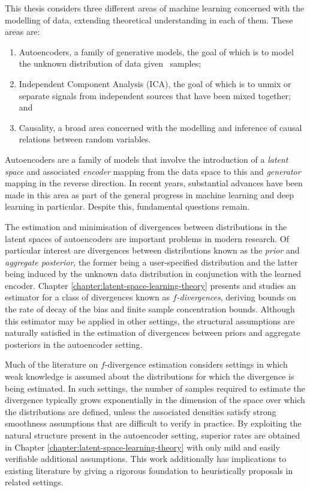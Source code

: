 This thesis considers three different areas of machine learning concerned with the modelling of data, extending theoretical understanding in each of them.
These areas are:
\begin{enumerate}
\item Autoencoders, a family of generative models, the goal of which is to model the unknown distribution of data given \iid~samples;
\item Independent Component Analysis (ICA), the goal of which is to unmix or separate signals from independent sources that have been mixed together; and
\item Causality, a broad area concerned with the modelling and inference of causal relations between random variables.
\end{enumerate}
Autoencoders are a family of models that involve the introduction of a \emph{latent space} and associated \emph{encoder} mapping from the data space to this and \emph{generator} mapping in the reverse direction. 
In recent years, substantial advances have been made in this area as part of the general progress in machine learning and deep learning in particular.
Despite this, fundamental questions remain.

The estimation and minimisation of divergences between distributions in the latent spaces of autoencoders are important problems in modern research.
Of particular interest are divergences between distributions known as the \emph{prior} and \emph{aggregate posterior}, the former being a user-specified distribution and the latter being induced by the unknown data distribution in conjunction with the learned encoder.
Chapter \ref{chapter:latent-space-learning-theory} presents and studies an estimator for a class of divergences known as \emph{$f$-divergences}, deriving bounds on the rate of decay of the bias and finite sample concentration bounds.
Although this estimator may be applied in other settings, the structural assumptions are naturally satisfied in the estimation of divergences between priors and aggregate posteriors in the autoencoder setting. 


Much of the literature on $f$-divergence estimation considers settings in which weak knowledge is assumed about the distributions for which the divergence is being estimated. 
In such settings, the number of samples required to estimate the divergence typically grows exponentially in the dimension of the space over which the distributions are defined, unless the associated densities satisfy strong smoothness assumptions that are difficult to verify in practice.
By exploiting the natural structure present in the autoencoder setting, superior rates are obtained in Chapter \ref{chapter:latent-space-learning-theory} with only mild and easily verifiable additional assumptions.
This work additionally has implications to existing literature by giving a rigorous foundation to heuristically proposals in related settings.


